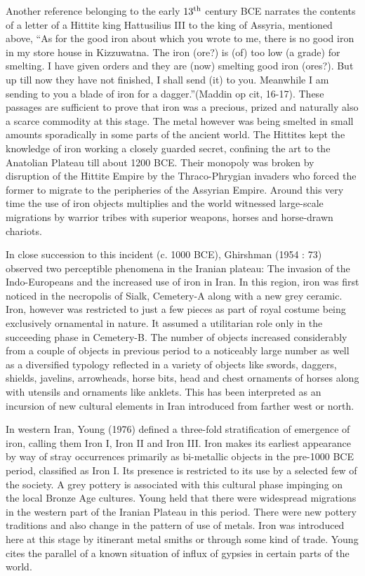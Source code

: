 Another reference belonging to the early $13^{\rm th}$ century BCE narrates the contents of a letter of a Hittite king Hattusilius III to the king of Assyria, mentioned above, “As for the good iron about which you wrote to me, there is no good iron in my store house in Kizzuwatna. The iron (ore?) is (of) too low (a grade) for smelting. I have given orders and they are (now) smelting good iron (ores?). But up till now they have not finished, I shall send (it) to you. Meanwhile I am sending to you a blade of iron for a dagger.”(Maddin op cit, 16-17). These passages are sufficient to prove that iron was a precious, prized and naturally also a scarce commodity at this stage. The metal however was being smelted in small amounts sporadically in some parts of the ancient world. The Hittites kept the knowledge of iron working a closely guarded secret, confining the art to the Anatolian Plateau till about 1200 BCE. Their monopoly was broken by disruption of the Hittite Empire by the Thraco-Phrygian invaders who forced the former to migrate to the peripheries of the Assyrian Empire. Around this very time the use of iron objects multiplies and the world witnessed large-scale migrations by warrior tribes with superior weapons, horses and horse-drawn chariots.

In close succession to this incident (c. 1000 BCE), Ghirshman (1954 : 73) observed two perceptible phenomena in the Iranian plateau: The invasion of the Indo-Europeans and the increased use of iron in Iran. In this region, iron was first noticed in the necropolis of Sialk, Cemetery-A along with a new grey ceramic. Iron, however was restricted to just a few pieces as part of royal costume being exclusively ornamental in nature. It assumed a utilitarian role only in the succeeding phase in Cemetery-B. The number of objects increased considerably from a couple of objects in previous period to a noticeably large number as well as a diversified typology reflected in a variety of objects like swords, daggers, shields, javelins, arrowheads, horse bits, head and chest ornaments of horses along with utensils and ornaments like anklets. This has been interpreted as an incursion of new cultural elements in Iran introduced from farther west or north.

In western Iran, Young (1976) defined a three-fold stratification of emergence of iron, calling them Iron I, Iron II and Iron III. Iron makes its earliest appearance by way of stray occurrences primarily as bi-metallic objects in the pre-1000 BCE period, classified as Iron I. Its presence is restricted to its use by a selected few of the society. A grey pottery is associated with this cultural phase impinging on the local Bronze Age cultures. Young held that there were widespread migrations in the western part of the Iranian Plateau in this period. There were new pottery traditions and also change in the pattern of use of metals. Iron was introduced here at this stage by itinerant metal smiths or through some kind of trade. Young cites the parallel of a known situation of influx of gypsies in certain parts of the world.

